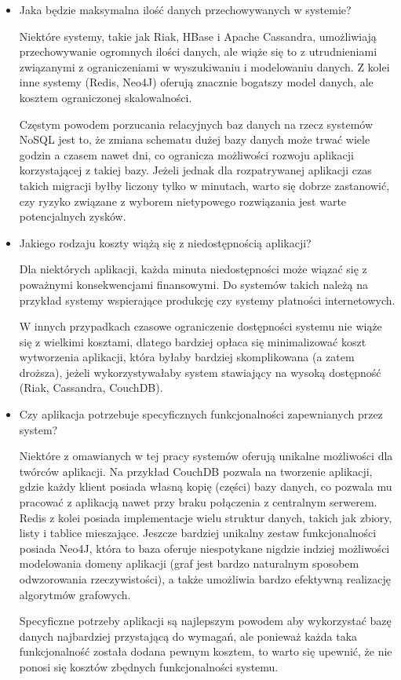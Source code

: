 \begin{itemize}
 
 \item Jaka będzie maksymalna ilość danych przechowywanych w systemie?

 Niektóre systemy, takie jak Riak, HBase i Apache Cassandra, umożliwiają przechowywanie ogromnych ilości danych, ale wiąże się to z utrudnieniami związanymi z ograniczeniami w wyszukiwaniu i modelowaniu danych.
 Z kolei inne systemy (Redis, Neo4J) oferują znacznie bogatszy model danych, ale kosztem ograniczonej skalowalności.

 Częstym powodem porzucania relacyjnych baz danych na rzecz systemów NoSQL jest to, że zmiana schematu dużej bazy danych może trwać wiele godzin a czasem nawet dni, co ogranicza możliwości rozwoju aplikacji korzystającej z takiej bazy.
 Jeżeli jednak dla rozpatrywanej aplikacji czas takich migracji byłby liczony tylko w minutach, warto się dobrze zastanowić, czy ryzyko związane z wyborem nietypowego rozwiązania jest warte potencjalnych zysków.

 \item Jakiego rodzaju koszty wiążą się z niedostępnością aplikacji?

 Dla niektórych aplikacji, każda minuta niedostępności może wiązać się z poważnymi konsekwencjami finansowymi.
 Do systemów takich należą na przykład systemy wspierające produkcję czy systemy płatności internetowych.

 W innych przypadkach czasowe ograniczenie dostępności systemu nie wiąże się z wielkimi kosztami, dlatego bardziej opłaca się minimalizować koszt wytworzenia aplikacji, która byłaby bardziej skomplikowana (a zatem droższa), jeżeli wykorzystywałaby system stawiający na wysoką dostępność (Riak, Cassandra, CouchDB).

 \item Czy aplikacja potrzebuje specyficznych funkcjonalności zapewnianych przez system?

 Niektóre z omawianych w tej pracy systemów oferują unikalne możliwości dla twórców aplikacji.
 Na przykład CouchDB pozwala na tworzenie aplikacji, gdzie każdy klient posiada własną kopię (części) bazy danych, co pozwala mu pracować z aplikacją nawet przy braku połączenia z centralnym serwerem.
 Redis z kolei posiada implementacje wielu struktur danych, takich jak zbiory, listy i tablice mieszające.
 Jeszcze bardziej unikalny zestaw funkcjonalności posiada Neo4J, która to baza oferuje niespotykane nigdzie indziej możliwości modelowania domeny aplikacji (graf jest bardzo naturalnym sposobem odwzorowania rzeczywistości), a także umożliwia bardzo efektywną realizację algorytmów grafowych.

 Specyficzne potrzeby aplikacji są najlepszym powodem aby wykorzystać bazę danych najbardziej przystającą do wymagań, ale ponieważ każda taka funkcjonalność została dodana pewnym kosztem, to warto się upewnić, że nie ponosi się kosztów zbędnych funkcjonalności systemu.

\end{itemize}


